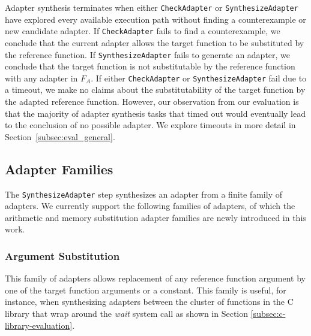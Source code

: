Adapter synthesis terminates when either \texttt{CheckAdapter} or \texttt{SynthesizeAdapter} have explored every available execution path without finding a counterexample or new candidate adapter.
%
If \texttt{CheckAdapter}  fails to find a counterexample, we conclude that the current adapter allows the target function to be substituted by the reference function.
%
If \texttt{SynthesizeAdapter}  fails to generate an adapter, we conclude that the target function is not substitutable by the reference function with any adapter in $F_A$.
%
%
If either \texttt{CheckAdapter} or \texttt{SynthesizeAdapter} fail due to a timeout, we make no claims about the substitutability of the target function by the adapted reference function.
However, our observation from our evaluation is that the majority of adapter synthesis tasks that timed out would eventually lead to the conclusion of no possible adapter.
%
We explore timeouts in more detail in Section~\ref{subsec:eval_general}.
%
\subsection{Adapter Families}
The \texttt{SynthesizeAdapter} step synthesizes an adapter from a finite family of adapters. 
%
We currently support the following families of adapters, of which the arithmetic and memory substitution adapter families are newly introduced in this work.
%
\subsubsection{Argument Substitution}
This family of adapters allows replacement of any reference function argument by one of the target function arguments or a constant.
This family is useful, for instance, when synthesizing adapters between the cluster of functions in the C library that wrap around the \textit{wait} system call as shown in Section \ref{subsec:c-library-evaluation}.
% 
%
%
